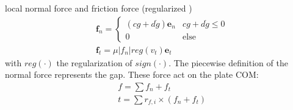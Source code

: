\documentclass[a4paper,fleqn]{cas-dc}
\begin{document}
local normal force and friction force (regularized \cite{vielsack1996regularisierung}) 
\begin{align}
	& \boldsymbol{f}_n = \left\{
	\begin{array}{ll}
	(c g + d \dot g)\boldsymbol{e}_n & c g + d \dot g \leq 0\\
	0 & \textrm{else}
	\end{array}\right.\\
	& \boldsymbol{f}_t = \mu |f_n | reg(v_t) \boldsymbol{e}_t
\end{align}
with $reg(\cdot)$ the regularization of $sign(\cdot)$. The piecewise definition of the normal force represents the gap. These force act on the plate COM: 
\begin{align}
	& f = \sum f_n + f_t\\
	& t = \sum r_{f,i}\times \left(f_n + f_t\right)
\end{align}
\end{document}
